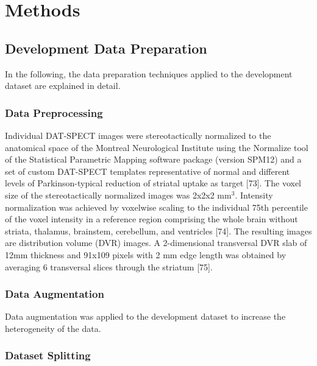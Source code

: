 \section{Methods}
\label{sec:methods}

\subsection{Development Data Preparation}

In the following, the data preparation techniques applied to the development dataset are explained in detail.

\subsubsection{Data Preprocessing}
\label{subsubsec:img_preprocess_dev}



Individual DAT-SPECT images were stereotactically normalized to the anatomical space of the Montreal Neurological Institute 
using the Normalize tool of the Statistical Parametric Mapping software package (version SPM12) and a set of custom DAT-SPECT templates 
representative of normal and different levels of Parkinson-typical reduction of striatal uptake as target [73]. 
The voxel size of the stereotactically normalized images was 2x2x2 mm$^{3}$. 
Intensity normalization was achieved by voxelwise scaling to the individual 75th percentile of the voxel intensity in a reference region 
comprising the whole brain without striata, thalamus, brainstem, cerebellum, and ventricles [74]. 
The resulting images are distribution volume (DVR) images. 
A 2-dimensional transversal DVR slab of 12mm thickness and 91x109 pixels with 2 mm edge length was obtained by averaging 6 transversal slices through the striatum [75]. 

\subsubsection{Data Augmentation}
\label{subsec:augment}

Data augmentation was applied to the development dataset to increase the heterogeneity of the data.


\subsubsection{Dataset Splitting}
\label{subsec:split}

